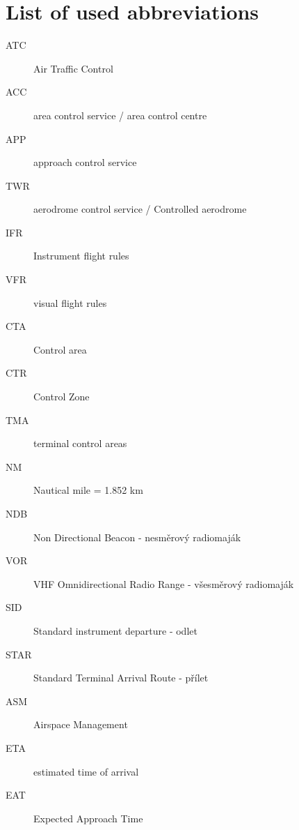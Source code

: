 \chapter{List of used abbreviations}

\begin{description}
\item[ATC] Air Traffic Control
\item[ACC] area control service / area control centre
\item[APP] approach control service
\item[TWR] aerodrome control service / Controlled aerodrome
\item[IFR] Instrument flight rules
\item[VFR] visual flight rules
\item[CTA] Control area
\item[CTR] Control Zone
\item[TMA] terminal control areas
\item[NM] Nautical mile = 1.852 km
\item[NDB] Non Directional Beacon - nesměrový radiomaják
\item[VOR] VHF Omnidirectional Radio Range - všesměrový radiomaják
\item[SID] Standard instrument departure - odlet
\item[STAR] Standard Terminal Arrival Route - přílet
\item[ASM] Airspace Management
\item[ETA] estimated time of arrival
\item[EAT] Expected Approach Time
\end{description}